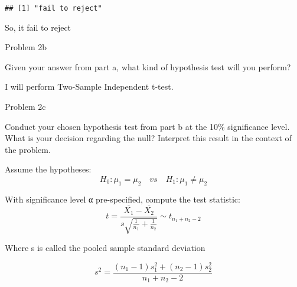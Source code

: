 \documentclass[
]{article}
\begin{document}
\begin{verbatim}
## [1] "fail to reject"
\end{verbatim}

So, it fail to reject

Problem 2b

Given your answer from part a, what kind of hypothesis test will you
perform?

I will perform Two-Sample Independent t-test.

Problem 2c

Conduct your chosen hypothesis test from part b at the 10\% significance
level. What is your decision regarding the null? Interpret this result
in the context of the problem.

Assume the hypotheses:
\[H_0 : \mu_1 = \mu_2 \quad vs \quad H_1 : \mu_1 \ne \mu_2\]

With significance level α pre-specified, compute the test statistic:
\[t = {\frac{\overline{X_1}-\overline{X_2}}{s\sqrt{\frac{1}{n_1}+\frac{1}{n_2}}}} \sim t_{n_1+n_2-2}\]

Where s is called the pooled sample standard deviation

\[s^2 = \frac{(n_1-1)s_1^2+(n_2-1)s_2^2}{n_1+n_2-2}\]
\end{document}
